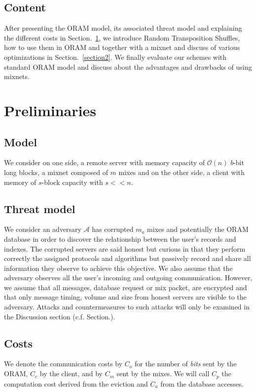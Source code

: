 \documentclass[a4paper]{article}
\begin{document}
\subsection{Content}
After presenting the ORAM model, its associated threat model and explaining the different costs in Section.~\ref{section1}, we introduce Random Transposition Shuffles, how to use them in ORAM and together with a mixnet and discuss of various optimizations in Section.~\ref{section2}.
We finally evaluate our schemes with standard ORAM model and discuss about the advantages and drawbacks of using mixnets.

\section{Preliminaries}
\label{section1}
\subsection{Model}
We consider on one side, a remote server with memory capacity of $\mathcal{O}\left(n\right)$ $b$-bit long blocks, a mixnet composed of $m$ mixes and on the other side, a client with memory of $s$-block capacity with $s<<n$. 

\subsection{Threat model}
We consider an adversary $\mathcal{A}$ has corrupted $m_{a}$ mixes and potentially the ORAM database in order to discover the relationship between the user's records and indexes. 
The corrupted servers are said honest but curious in that they perform correctly the assigned protocols and algorithms but passively record and share all information they observe to achieve this objective.
We also assume that the adversary observes all the user's incoming and outgoing communication. However, we assume that all messages, database request or mix packet, are encrypted and that only message timing, volume and size from honest servers are visible to the adversary.
Attacks and countermeasures to such attacks will only be examined in the Discussion section (c.f. Section.\cite{}).

\subsection{Costs}
We denote the communication costs by $C_o$ for the number of \emph{bits} sent by the ORAM, $C_{c}$ by the client, and by $C_{m}$ sent by the mixes. 
We will call $C_p$ the computation cost derived from the eviction and $C_a$ from the database accesses.
\end{document}
